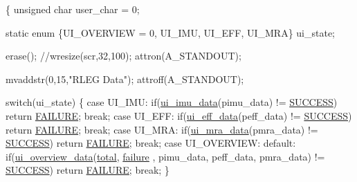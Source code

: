 \begin{DoxyCode}
\{
        \textcolor{keywordtype}{unsigned} \textcolor{keywordtype}{char} user\_char = 0;

        \textcolor{keyword}{static} \textcolor{keyword}{enum} \{UI\_OVERVIEW = 0, UI\_IMU, UI\_EFF, UI\_MRA\} ui\_state;

        erase();
        \textcolor{comment}{//wresize(scr,32,100);}
        attron(A\_STANDOUT);

        mvaddstr(0,15,\textcolor{stringliteral}{"RLEG Data"});
        attroff(A\_STANDOUT);

        \textcolor{keywordflow}{switch}(ui\_state)
        \{
                \textcolor{keywordflow}{case} UI\_IMU:
                        \textcolor{keywordflow}{if}(\hyperlink{group__ui_ga7d5a9d9a75693709de408781d001a6a6}{ui\_imu\_data}(pimu\_data) != \hyperlink{calibration_2calibration_8h_aa90cac659d18e8ef6294c7ae337f6b58}{SUCCESS})
       \textcolor{keywordflow}{return} \hyperlink{calibration_2calibration_8h_a6d58f9ac447476b4e084d7ca383f5183}{FAILURE};
                        \textcolor{keywordflow}{break};
                \textcolor{keywordflow}{case} UI\_EFF:
                        \textcolor{keywordflow}{if}(\hyperlink{ui_8c_af48496a4ce54378764bc4ca9eddfd498}{ui\_eff\_data}(peff\_data) != \hyperlink{calibration_2calibration_8h_aa90cac659d18e8ef6294c7ae337f6b58}{SUCCESS})
       \textcolor{keywordflow}{return} \hyperlink{calibration_2calibration_8h_a6d58f9ac447476b4e084d7ca383f5183}{FAILURE};
                        \textcolor{keywordflow}{break};
                \textcolor{keywordflow}{case} UI\_MRA:
                        \textcolor{keywordflow}{if}(\hyperlink{group__ui_gaefec243c5df45db0350c1abbccf20e3b}{ui\_mra\_data}(pmra\_data) != \hyperlink{calibration_2calibration_8h_aa90cac659d18e8ef6294c7ae337f6b58}{SUCCESS})
       \textcolor{keywordflow}{return} \hyperlink{calibration_2calibration_8h_a6d58f9ac447476b4e084d7ca383f5183}{FAILURE};
                        \textcolor{keywordflow}{break};
                \textcolor{keywordflow}{case} UI\_OVERVIEW:
                \textcolor{keywordflow}{default}:
                        \textcolor{keywordflow}{if}(\hyperlink{ui_8c_a6577e01f0ebf9ac1677c616228a64a46}{ui\_overview\_data}(\hyperlink{main2_8c_ac7af894858cf396a219d632f40afdc8d}{total}, \hyperlink{main2_8c_a4f35e5ea2395561d0bd3b2f45612dc2c}{failure}
      , pimu\_data, peff\_data, pmra\_data) != \hyperlink{calibration_2calibration_8h_aa90cac659d18e8ef6294c7ae337f6b58}{SUCCESS}) \textcolor{keywordflow}{return} \hyperlink{calibration_2calibration_8h_a6d58f9ac447476b4e084d7ca383f5183}{FAILURE};
                        \textcolor{keywordflow}{break};
        \}


\end{DoxyCode}
